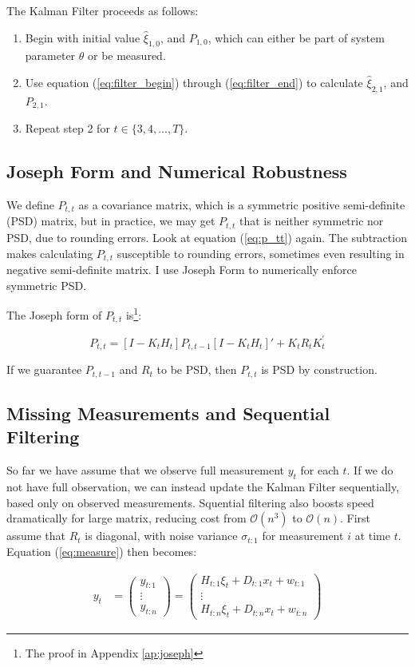 \documentclass[12pt]{article}
\newenvironment{boenumerate}
    {\begin{enumerate}\renewcommand\labelenumi{\textbf\theenumi}}
    {\end{enumerate}}
\numberwithin{equation}{section}
\begin{document}
The Kalman Filter proceeds as follows:

\begin{boenumerate}
    \item Begin with initial value $\hat{\xi}_{1,0}$, and $P_{1,0}$, which can either be part of system parameter $\theta$ or be measured. 
    \item Use equation (\ref{eq:filter_begin}) through (\ref{eq:filter_end}) to calculate $\hat{\xi}_{2,1}$, and $P_{2,1}$.
    \item Repeat step 2 for $t\in\{3, 4, ..., T\}$.
\end{boenumerate}

\subsection{Joseph Form and Numerical Robustness}

We define $P_{t,t}$ as a covariance matrix, which is a symmetric positive semi-definite (PSD) matrix, but in practice, we may get $P_{t,t}$ that is neither symmetric nor PSD, due to rounding errors. Look at equation (\ref{eq:p_tt}) again. The subtraction makes calculating $P_{t,t}$ susceptible to rounding errors, sometimes even resulting in negative semi-definite matrix. I use Joseph Form to numerically enforce symmetric PSD. 

The Joseph form of $P_{t,t}$ is\footnote{The proof in Appendix \ref{ap:joseph}}:

\[
    P_{t,t} = [I - K_tH_t]P_{t,t-1}[I - K_tH_t]' + K_tR_tK_t^{'}    
\]

If we guarantee $P_{t,t-1}$ and $R_t$ to be PSD, then $P_{t,t}$ is PSD by construction. 

\subsection{Missing Measurements and Sequential Filtering}

So far we have assume that we observe full measurement $y_t$ for each $t$. If we do not have full observation, we can instead update the Kalman Filter sequentially, based only on observed measurements. Squential filtering also boosts speed dramatically for large matrix, reducing cost from $\mathcal{O}(n^3)$ to $\mathcal{O}(n)$. First assume that $R_t$ is diagonal, with noise variance $\sigma_{t:1}$ for measurement $i$ at time $t$. Equation (\ref{eq:measure}) then becomes:

\begin{align*}
    y_t &= 
    \begin{pmatrix}
        y_{t:1} \\
        \vdots \\ 
        y_{t:n}
    \end{pmatrix} 
    = \begin{pmatrix}
        H_{t:1}\xi_t + D_{t:1}x_t + w_{t:1} \\
        \vdots \\
        H_{t:n}\xi_t + D_{t:n}x_t + w_{t:n}
    \end{pmatrix}
\end{align*}
\end{document}
